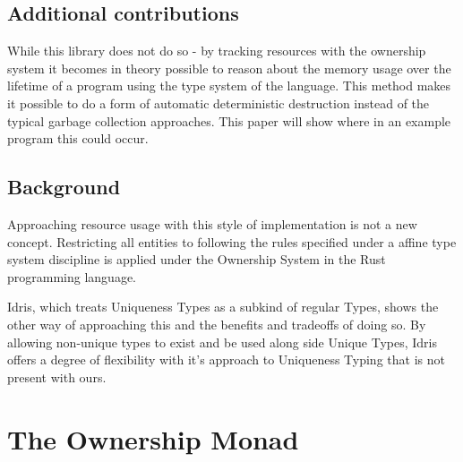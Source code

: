 \documentclass[onehalf,11pt]{beavtex}
\begin{document}
\section{Additional contributions}

While this library does not do so - by tracking resources with the ownership
system it becomes in theory possible to reason about the memory usage over the
lifetime of a program using the type system of the language. 
This method makes it possible to do a form of automatic deterministic destruction
instead of the typical garbage collection approaches.  This paper will show
where in an example program this could occur.


\section{Background}

Approaching resource usage with this style of implementation is not a new
concept.
Restricting all entities to following the rules specified under a affine type
system discipline is applied under the Ownership System in the Rust
programming language. 

Idris, which treats Uniqueness Types as a subkind of regular Types, shows
the other way of approaching this and the benefits and tradeoffs of doing so.
By allowing non-unique types to exist and be used along side Unique Types,
Idris offers a degree of flexibility with it's approach to Uniqueness
Typing that is not present with ours. %



\chapter{The Ownership Monad}
\end{document}
